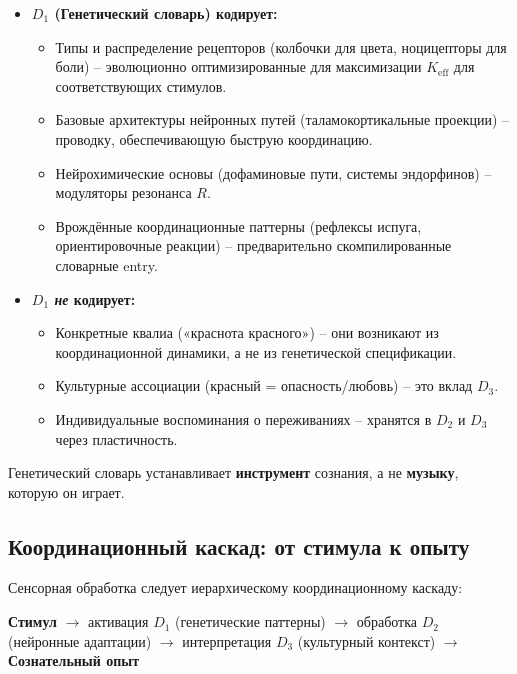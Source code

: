 \documentclass[12pt,a4paper]{article}
\newcommand{\eff}{\mathrm{eff}}
\newcommand{\Ke}{K_{\eff}}
\begin{document}
	\begin{itemize}
		\item \textbf{$D_1$ (Генетический словарь) кодирует:}
		\begin{itemize}
			\item Типы и распределение рецепторов (колбочки для цвета, ноцицепторы для боли) – эволюционно оптимизированные для максимизации $\Ke$ для соответствующих стимулов.
			\item Базовые архитектуры нейронных путей (таламокортикальные проекции) – проводку, обеспечивающую быструю координацию.
			\item Нейрохимические основы (дофаминовые пути, системы эндорфинов) – модуляторы резонанса $R$.
			\item Врождённые координационные паттерны (рефлексы испуга, ориентировочные реакции) – предварительно скомпилированные словарные entry.
		\end{itemize}
		
		\item \textbf{$D_1$ \textit{не} кодирует:}
		\begin{itemize}
			\item Конкретные квалиа («краснота красного») – они возникают из координационной динамики, а не из генетической спецификации.
			\item Культурные ассоциации (красный = опасность/любовь) – это вклад $D_3$.
			\item Индивидуальные воспоминания о переживаниях – хранятся в $D_2$ и $D_3$ через пластичность.
		\end{itemize}
	\end{itemize}
	
	Генетический словарь устанавливает \textbf{инструмент} сознания, а не \textbf{музыку}, которую он играет.
	
	\subsection{Координационный каскад: от стимула к опыту}
	
	Сенсорная обработка следует иерархическому координационному каскаду:
	
	\begin{center}
		\textbf{Стимул} $\rightarrow$ активация $D_1$ (генетические паттерны) $\rightarrow$ обработка $D_2$ (нейронные адаптации) $\rightarrow$ интерпретация $D_3$ (культурный контекст) $\rightarrow$ \textbf{Сознательный опыт}
	\end{center}
	
\end{document}
